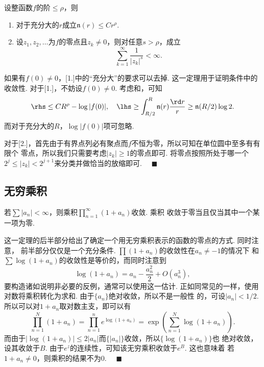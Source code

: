   \begin{thm}
    \label{thm: 整函数的阶}
    设整函数$f$的阶$\le\rho$，则
    \begin{enumerate}
      \item 对于充分大的$r$成立$\mathfrak{n}(r)\le Cr^\rho$.
      \item 设$z_1,z_2,\dots$为$f$的零点且$z_k\ne 0$，则对任意$s>\rho$，成立
        \[
          \sum_{k=1}^\infty\frac{1}{|z_k|^s} < \infty.
        \]
    \end{enumerate}
  \end{thm}
  \remark
    如果有$f(0)\ne 0$，[1.]中的“充分大”的要求可以去掉. 这一定理用于证明条件中的收敛性.
  \proof
    对于[1.]，不妨设$f(0)\ne 0$. 考虑和，可知
    \[\begin{split}
      \rhs \le CR^\rho-\log|f(0)|,\quad
      \lhs \ge \int_{R/2}^R\mathfrak{n}(r)\frac{\rd r}{r}\ge 
      \mathfrak{n}(R/2)\log 2.
    \end{split}\]
    而对于充分大的$R$，$\log|f(0)|$项可忽略.\par
    对于[2.]，首先由于有界点列必有聚点而$f$不恒为零，所以可知在单位圆中至多有有限个
    零点，所以我们只需要考虑$|z_k|\ge 1$的零点即可. 将零点按照所处于哪一个$2^j\le
    |z_k|<2^{j+1}$来分类并做恰当的放缩即可. $\quad\blacksquare$


\subsection{无穷乘积}
  \begin{thm}
    \label{thm: 无穷乘积}
    若$\sum|a_n|<\infty$，则乘积$\prod_{n=1}^\infty(1+a_n)$收敛. 乘积
    收敛于零当且仅当其中一个某一项为零.
  \end{thm}
  \remark
    这一定理的后半部分给出了确定一个用无穷乘积表示的函数的零点的方式. 同时注意，
    前半部分仅仅是一个充分条件. $\prod(1+a_n)$的收敛性在$a_n\ne -1$的情况下
    和$\sum\log(1+a_n)$的收敛性是等价的，而同时注意到
    \[
      \log(1+a_n) = a_n - \frac{a_n^2}{2} + O(a_n^3), 
    \]
    要构造诸如说明非必要的反例，通常可以使用这一估计.
  \proof
    正如同常见的一样，使用对数将乘积转化为求和. 由于$\{a_n\}$绝对收敛，所以不是一般性
    的，可设$|a_n|<1/2$. 所以可以对$1+a_n$取对数主支，即可以有
    \[
      \prod_{n=1}^N(1+a_n) = \prod_{n=1}^ne^{\log(1+a_n)}
      = \exp\left(\sum_{n=1}^N\log(1+a_n)\right).
    \]
    而由于$|\log(1+a_n)|\le 2|a_n|$而$\{|a_n|\}$收敛，所以$\{\log(1+a_n)\}$也
    绝对收敛，设其收敛于$B$. 由于$e^z$的连续性，可知该无穷乘积收敛于$e^B$. 这也意味着
    若$1+a_n\ne 0$，则乘积的结果不为$0$. $\quad\blacksquare$

